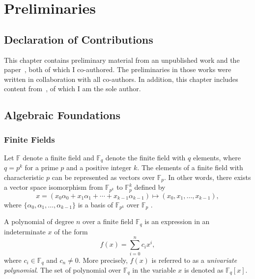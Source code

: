 \chapter{Preliminaries} \label{ch:preliminaries}

\section*{Declaration of Contributions}
This chapter contains preliminary material from an unpublished work and the paper~\cite{Badakhshan2025Ursa}, both of which I co-authored. The preliminaries in those works were written in collaboration with all co-authors. In addition, this chapter includes content from~\cite{Badakhshan2024Zupply}, of which I am the sole author.


\section{Algebraic Foundations}

\subsection{Finite Fields}\label{sec:prel_finite_field}
Let $\mathbb{F}$ denote a finite field and $\mathbb{F}_q$ denote the finite field with $q$ elements, where $q=p^k$ for a prime $p$ and a positive integer $k$. The elements of a finite field with characteristic $p$ can be represented as vectors over $\mathbb{F}_p$. In other words, there exists a vector space isomorphism from $\mathbb{F}_{p^k}$ to $\mathbb{F}_p^k$ defined by $$x=(x_0\alpha_0+x_1\alpha_1+ \cdots +x_{k-1}\alpha_{k-1}) \mapsto (x_0,x_1, \ldots,x_{k-1}),$$ where $\{\alpha_{0},\alpha_{1},\ldots,\alpha_{k-1}\}$ is a basis of $\mathbb{F}_{p^k}$ over $\mathbb{F}_p$ \cite{samanta2023thesis}.

A polynomial of degree $n$ over a finite field $\mathbb{F}_{q}$ is an expression in an indeterminate $x$ of the form
\[
f(x) = \sum_{i=0}^{n} c_i x^i,
\]
where $c_i \in \mathbb{F}_{q}$ and $c_n \neq 0$. More precisely, $f(x)$ is referred to as a \textit{univariate polynomial}. The set of polynomial over $\mathbb{F}_{q}$ in the variable $x$ is denoted as $\mathbb{F}_{q}[x]$. 

